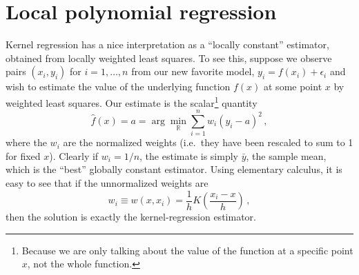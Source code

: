 \documentclass[11pt]{article}
\begin{document}
\newpage
\section{Local polynomial regression}

Kernel regression has a nice interpretation as a ``locally constant'' estimator, obtained from locally weighted least squares.  To see this, suppose we observe pairs $(x_i, y_i)$ for $i = 1, \ldots, n$ from our new favorite model, $y_i = f(x_i) + \epsilon_i$ and wish to estimate the value of the underlying function $f(x)$ at some point $x$ by weighted least squares.  Our estimate is the scalar\footnote{Because we are only talking about the value of the function at a specific point $x$, not the whole function.} quantity
$$
\hat{f}(x) = a = \arg \min_{\mathbb{R}} \sum_{i=1}^n w_i (y_i - a)^2 \, ,
$$
where the $w_i$ are the normalized weights (i.e.~they have been rescaled to sum to 1 for fixed $x$).  Clearly if $w_i = 1/n$, the estimate is simply $\bar{y}$, the sample mean, which is the ``best'' globally constant estimator.  Using elementary calculus, it is easy to see that if the unnormalized weights are
$$
w_i \equiv w(x, x_i) = \frac{1}{h} K \left( \frac{x_i - x}{h} \right)  \, ,
$$
then the solution is exactly the kernel-regression estimator.
\end{document}
